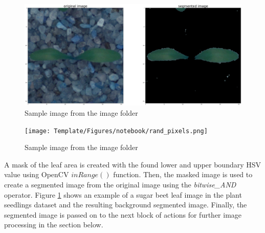\begin{figure}[!htb]
    \centering
    \includegraphics[scale=0.18, keepaspectratio]{Figures/segmen_sugar.png}
    \caption{Sample image from the image folder}
    \label{fig:my_segmen_sugar}
\end{figure}


\begin{figure}[!htb]
    \centering
    \texttt{[image: Template/Figures/notebook/rand\_pixels.png]}
    \caption{Sample image from the image folder}
    \label{fig:my_hsv}
\end{figure} 

A mask of the leaf area is created with the found lower and upper boundary HSV value using OpenCV $inRange()$ function. Then, the masked image is used to create a segmented image from the original image using the \textit{bitwise\_AND} operator. Figure \ref{fig:my_segmen_sugar} shows an example of a sugar beet leaf image in the plant seedlings dataset and the resulting background segmented image. Finally, the segmented image is passed on to the next block of actions for further image processing in the section below.

\newpage
